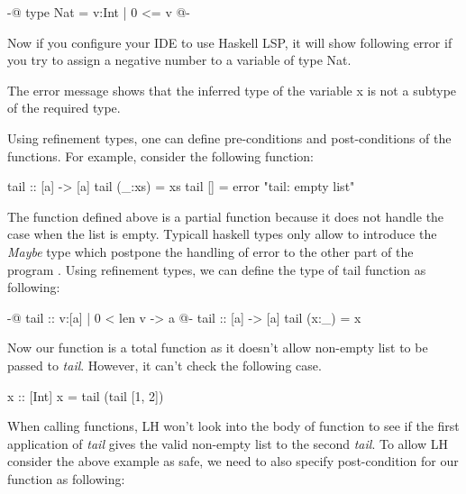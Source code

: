 \documentclass[]{rptuseminar}
\begin{document}
\begin{haskell}
 {-@ type Nat = {v:Int | 0 <= v} @-}
\end{haskell}

Now if you configure your IDE to use Haskell LSP, it will show following error if you try to assign a negative number to a variable of type Nat.
The error message shows that the inferred type of the variable x is not a subtype of the required type.

Using refinement types, one can define pre-conditions and post-conditions of the functions\cite{jhala_programming_2020}. 
For example, consider the following function:

\begin{haskell}
 tail :: [a] -> [a]
 tail (_:xs) = xs
 tail [] = error "tail: empty list"
\end{haskell}

The function defined above is a partial function because it does not handle the case when the list is empty. 
Typicall haskell types only allow to introduce the \textit{Maybe} type which postpone the handling of error to the other 
part of the program \cite{jhala_programming_2020}. Using refinement types, we can define the type of tail function as following:

\begin{haskell}
 {-@ tail :: {v:[a] | 0 < len v} -> a @-}
 tail :: [a] -> [a]
 tail (x:_) = x
\end{haskell}

Now our function is a total function as it doesn't allow non-empty list to be passed to \textit{tail}. However, it can't 
check the following case.

\begin{haskell}
 x :: [Int]
 x = tail (tail [1, 2])
\end{haskell}

When calling functions, LH won't look into the body of function to see if the first application of \textit{tail} gives the valid non-empty list to the second \textit{tail}.
To allow LH consider the above example as safe, we need to also specify post-condition for our function as following:
\end{document}
